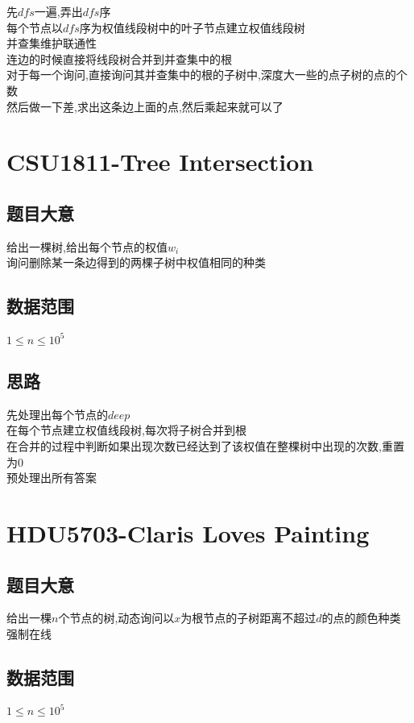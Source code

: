 \documentclass{ctexart}
\numberwithin{equation}{section}
\begin{document}
\begin{flushleft}
  先$dfs$一遍,弄出$dfs$序\\
  每个节点以$dfs$序为权值线段树中的叶子节点建立权值线段树\\ 
  并查集维护联通性\\
  连边的时候直接将线段树合并到并查集中的根\\
  对于每一个询问,直接询问其并查集中的根的子树中,深度大一些的点子树的点的个数\\
  然后做一下差,求出这条边上面的点,然后乘起来就可以了\\
  \newpage
  
  
  \section{CSU1811-Tree Intersection}
  \subsection{题目大意}
  给出一棵树,给出每个节点的权值$w_i$\\
  询问删除某一条边得到的两棵子树中权值相同的种类\\
  \subsection{数据范围}
  $1\le n\le 10^5$\\
  \subsection{思路}
  先处理出每个节点的$deep$ \\
  在每个节点建立权值线段树,每次将子树合并到根\\
  在合并的过程中判断如果出现次数已经达到了该权值在整棵树中出现的次数,重置为$0$\\
  预处理出所有答案\\
  \newpage

  \section{HDU5703-Claris Loves Painting}
  \subsection{题目大意}
  给出一棵$n$个节点的树,动态询问以$x$为根节点的子树距离不超过$d$的点的颜色种类\\
  强制在线\\
  \subsection{数据范围}
  $1\le n\le 10^5$\\

\end{flushleft}
\end{document}
